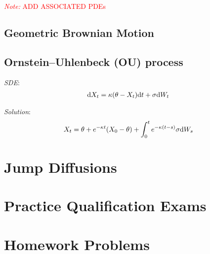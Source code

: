 \documentclass[12pt]{article}
\newcommand{\note}[1]{\textcolor{red}{\textit{Note:} #1}}
\begin{document}
\note{ADD ASSOCIATED PDEs}

\subsection{Geometric Brownian Motion}


\subsection{Ornstein--Uhlenbeck (OU) process}
\textit{SDE}:
\begin{align*}
    \mathrm{d} X_t = \kappa(\theta-X_t)\mathrm{d} t + \sigma \mathrm{d} W_t
\end{align*}

\textit{Solution}:
\begin{align*}
    X_t = \theta + e^{-\kappa t}(X_0-\theta) + \int_0^t e^{-\kappa(t-s)}\sigma \mathrm{d} W_s
\end{align*}



\pagebreak
\section{Jump Diffusions}



\pagebreak
\section{Practice Qualification Exams}


\pagebreak
\section{Homework Problems}








\end{document}
